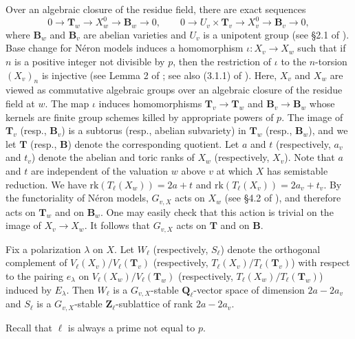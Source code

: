 \documentclass{amsart}
\def\Q{{\mathbf Q}}
\def\Z{{\mathbf Z}}
\def\rk{\mathrm{rk}}
\def\T{{\mathbf T}}
\def\B{{\mathbf B}}
\theoremstyle{definition}
\begin{document}
Over an algebraic closure of the residue field, there are 
exact sequences
$$0 \to \T_{w} \to X_{w}^{0} \to \B_{w} \to 0, \qquad 
0 \to U_{v} \times \T_{v} \to X_{v}^{0} \to \B_{v} \to 0,$$
where $\B_{w}$ and $\B_{v}$ are abelian varieties  
and $U_{v}$ is a unipotent group
(see \S 2.1 of \cite{SGA}). 
Base change for N\'eron models induces  
a homomorphism  
     $\iota:X_{v} \to X_{w}$
such that 
if $n$ is a positive integer not divisible by $p$, then the restriction of 
$\iota$ to the $n$-torsion $(X_{v})_n$ is injective
(see  Lemma 2 of \cite{SerreTate}; see also (3.1.1)
of \cite{SGA}). 
Here, $X_v$ and $X_w$ are viewed as commutative algebraic groups
over an algebraic closure of the residue field at $w$.
The map $\iota$ induces homomorphisms
$\T_{v} \to\T_{w}$ and $\B_{v} \to \B_{w}$
whose kernels are finite group schemes killed by 
appropriate powers of $p$.
The image of $\T_{v}$ (resp., $\B_v$) is a subtorus 
(resp., abelian subvariety) in $\T_{w}$
(resp., $\B_w$),
and we let $\T$ 
(resp., $\B$) denote the corresponding quotient.
Let $a$ and $t$ (respectively, $a_{v}$ and $t_{v}$)
denote the abelian and toric ranks of $X_{w}$ 
(respectively, $X_{v}$).
Note that $a$ and $t$ are independent of the valuation $w$ 
above $v$ at which $X$ has semistable reduction. 
We have $\rk(T_\ell(X_w))=2a+t$ and 
$\rk(T_\ell(X_v))=2a_v+t_v$.
By the functoriality of N\'eron models, $G_{v,X}$ acts on $X_{w}$
(see \S 4.2 of \cite{SGA}),
and therefore acts on  $\T_{w}$ and on $\B_w$.
One may easily check that this action is trivial on the 
image of $X_v \to X_w$.
It follows that $G_{v,X}$ acts on $\T$ and on $\B$.

Fix a polarization $\lambda$ on $X$. 
Let $W_{\ell}$ (respectively, $S_{\ell}$) 
denote the orthogonal complement of 
$V_{\ell}(X_{v})/V_{\ell}(\T_{v})$
(respectively, $T_{\ell}(X_{v})/T_{\ell}(\T_{v})$)
with respect to the 
pairing $e_{\lambda}$ on $V_{\ell}(X_{w})/V_{\ell}(\T_{w})$
(respectively, $T_{\ell}(X_{w})/T_{\ell}(\T_{w})$)
induced by $E_{\lambda}$. 
Then 
$W_{\ell}$ is a $G_{v,X}$-stable
$\Q_\ell$-vector space of dimension $2a-2a_{v}$ and
$S_{\ell}$ is a $G_{v,X}$-stable $\Z_\ell$-sublattice of 
rank $2a-2a_{v}$.

Recall that $\ell$ is always a prime not equal to $p$.
\end{document}
